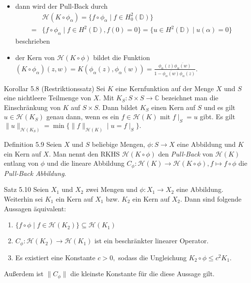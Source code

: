 \documentclass{beamer}
\begin{document}
\begin{frame}
\begin{itemize}
\item dann wird der Pull-Back durch 
\begin{align*}
&\mathcal{H}(K\circ \phi_{\alpha})=\{f \circ \phi_{\alpha} \mid f \in H_0^2(\mathbb{D}) \}\\
=&\{f\circ \phi_{\alpha} \mid f\in H^2(\mathbb{D}),f(0)=0\}
=\{u\in H^2(\mathbb{D})\mid u(\alpha)=0\} 
\end{align*}
beschrieben \pause
\item der Kern von $\mathcal{H}(K\circ \phi)$ bildet die Funktion $(K\circ\phi_{\alpha})(z,w) =K(\phi_\alpha(z),\phi_\alpha(w))=\frac{\phi_{\alpha}(z)\overline{\phi_{\alpha}(w)}}{1-\overline{\phi_\alpha(w)}\phi_\alpha(z)}.$
\end{itemize}
\end{frame}

\begin{frame}
\begin{block}{Korollar 5.8 (Restriktionssatz)}
Sei $K$ eine Kernfunktion auf der Menge $X$ und $S$ eine nichtleere Teilmenge von $X.$ Mit $K_S:S\times S\to \mathbb{C}$ bezeichnet man die Einschränkung von $K$ auf $S\times S.$ Dann bildet $K_S$ einen Kern auf $S$ und es gilt $u\in \mathcal{H}(K_S)$ genau dann, wenn es ein $f\in\mathcal{H}(K)$ mit $f\mid_{S}=u$ gibt.  Es gilt $\|u\|_{\mathcal{H}(K_S)}=\min\{\|f\|_{\mathcal{H}(K)}\mid u=f\mid_{S}\}.$
\end{block}
\end{frame}

\begin{frame}
\begin{block}{Definition 5.9}
Seien $X$ und $S$ beliebige Mengen, $\phi:S\to X$ eine Abbildung und $K$ ein Kern auf $X.$ Man nennt den RKHS $\mathcal{H}(K\circ \phi)$ den \emph{Pull-Back} von $\mathcal{H}(K)$ entlang von $\phi$ und die lineare Abbildung $C_{\phi}:\mathcal{H}(K)\to \mathcal{H}(K\circ \phi),f\mapsto f\circ \phi$ die \emph{Pull-Back Abbildung}.   
\end{block}
\end{frame}

\begin{frame}
\begin{block}{Satz 5.10}
Seien $X_1$ und $X_2$ zwei Mengen und $\phi:X_1\to X_2$ eine Abbildung. Weiterhin sei $K_1$ ein Kern auf $X_1$ bzw. $K_2$ ein Kern auf $X_2.$ Dann sind folgende Aussagen äquivalent:
\begin{enumerate}
\item $\{f\circ \phi \mid f\in \mathcal{H}(K_2)\}\subseteq \mathcal{H}(K_1)$
\item $C_{\phi}:\mathcal{H}(K_2)\to \mathcal{H}(K_1) $ ist ein beschränkter linearer Operator.
\item Es existiert eine Konstante $c>0,$ sodass die Ungleichung $K_2 \circ \phi \leq c^2K_1.$ 
\end{enumerate}
Außerdem ist $\|C_{\phi}\|$ die kleinste Konstante für die diese Aussage gilt.
\end{block}
\end{frame}
\end{document}
